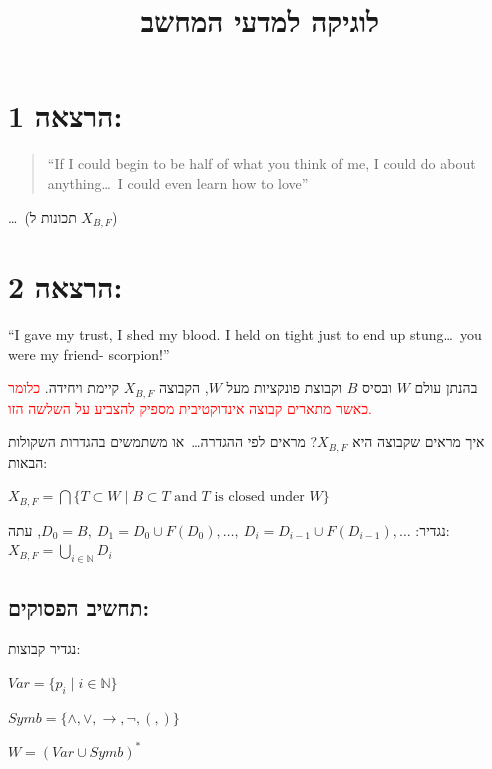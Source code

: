 \documentclass[12pt,a4paper]{article}
\title{לוגיקה למדעי המחשב}
\author{}
\date{}
\begin{document}
\maketitle

\section*{הרצאה 1:}

\begin{quote}
\textenglish{``If I could begin to be half of what you think of me, I could do about anything\ldots\ I could even learn how to love''}
\end{quote}

\ldots\ (תכונות ל $X_{B,F}$)

\section*{הרצאה 2:}

\textenglish{``I gave my trust, I shed my blood. I held on tight just to end up stung\ldots\ you were my friend- scorpion!''}

בהנתן עולם $W$ ובסיס $B$ וקבוצת פונקציות מעל $W$, הקבוצה $X_{B,F}$ קיימת ויחידה.
\textcolor{red}{כלומר כאשר מתארים קבוצה אינדוקטיבית מספיק להצביע על השלשה הזו.}

איך מראים שקבוצה היא $X_{B,F}$? מראים לפי ההגדרה\ldots\ או משתמשים בהגדרות השקולות הבאות:

$X_{B,F}=\bigcap\{T\subset W \mid B\subset T \text{ and } T \text{ is closed under } W\}$

נגדיר: $D_{0}=B,\ D_{1}=D_{0}\cup F(D_{0}),\ldots,\ D_{i}=D_{i-1}\cup F(D_{i-1}),\ldots$, עתה: $X_{B,F}=\bigcup_{i\in\mathbb{N}}D_{i}$

\subsection*{תחשיב הפסוקים:}

נגדיר קבוצות:

$Var=\{p_{i} \mid i\in\mathbb{N}\}$

$Symb=\{\wedge,\vee,\rightarrow,\lnot,(,)\}$

$W=(Var\cup Symb)^{*}$
\end{document}

